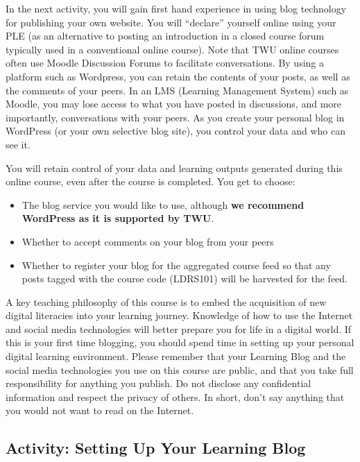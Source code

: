 \documentclass[
]{book}
\providecommand{\tightlist}{%
  \setlength{\itemsep}{0pt}\setlength{\parskip}{0pt}}
\theoremstyle{definition}
\theoremstyle{definition}
\theoremstyle{definition}
\theoremstyle{definition}
\theoremstyle{remark}
\begin{document}
In the next activity, you will gain first hand experience in using blog technology for publishing your own website. You will ``declare'' yourself online using your PLE (as an alternative to posting an introduction in a closed course forum typically used in a conventional online course). Note that TWU online courses often use Moodle Discussion Forums to facilitate conversations. By using a platform such as Wordpress, you can retain the contents of your posts, as well as the comments of your peers. In an LMS (Learning Management System) such as Moodle, you may lose access to what you have posted in discussions, and more importantly, conversations with your peers. As you create your personal blog in WordPress (or your own selective blog site), you control your data and who can see it.

You will retain control of your data and learning outputs generated during this online course, even after the course is completed.
You get to choose:

\begin{itemize}
\tightlist
\item
  The blog service you would like to use, although \textbf{we recommend WordPress as it is supported by TWU}.\\
\item
  Whether to accept comments on your blog from your peers\\
\item
  Whether to register your blog for the aggregated course feed so that any posts tagged with the course code (LDRS101) will be harvested for the feed.
\end{itemize}

A key teaching philosophy of this course is to embed the acquisition of new digital literacies into your learning journey. Knowledge of how to use the Internet and social media technologies will better prepare you for life in a digital world. If this is your first time blogging, you should spend time in setting up your personal digital learning environment. Please remember that your Learning Blog and the social media technologies you use on this course are public, and that you take full responsibility for anything you publish. Do not disclose any confidential information and respect the privacy of others. In short, don't say anything that you would not want to read on the Internet.

\hypertarget{activity-setting-up-your-learning-blog}{%
\subsection*{Activity: Setting Up Your Learning Blog}\label{activity-setting-up-your-learning-blog}}
\end{document}
